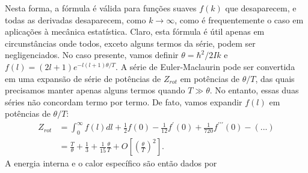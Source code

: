 \documentclass[12pt]{article}
\begin{document}
Nesta forma, a fórmula é válida para funções suaves $f(k)$ que desaparecem, e todas as derivadas desaparecem, como $k \rightarrow \infty$, como é frequentemente o caso em aplicações à mecânica estatística. Claro, esta fórmula é útil apenas em circunstâncias onde todos, exceto alguns termos da série, podem ser negligenciados. No caso presente, vamos definir $ \theta =\hbar^{2}/2Ik$ e $f(l) = (2l+1) e^{-l(l+1)\theta/T}$. A série de Euler-Maclaurin pode ser convertida em uma expansão de série de potências de $Z_{rot}$ em potências de $\theta/T$, das quais precisamos manter apenas alguns termos quando $T \gg \theta$. No entanto, essas duas séries não concordam termo por termo. De fato, vamos expandir $f(l)$ em potências de $\theta/T$:
\begin{align}
Z_{rot} &= \int^{\infty}_{0} f(l)dl + \frac{1}{2}f(0) - \frac{1}{12}f^{\prime}(0) + \frac{1}{720}f^{\prime \prime \prime}(0) - (...) \\
&= \frac{T}{\theta} + \frac{1}{3} + \frac{1}{15}\frac{\theta}{T} + O\left[\left(\frac{\theta}{T} \right)^{2} \right].
\end{align}
A energia interna e o calor específico são então dados por
\end{document}
